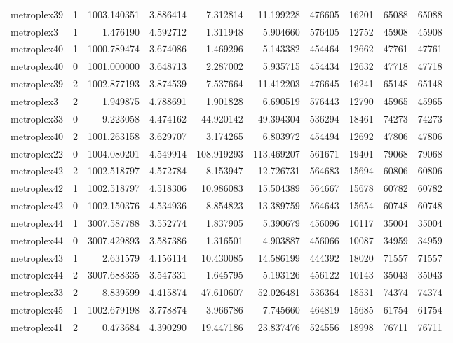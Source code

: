 \begin{longtable}{|l|r|r|r|r|r|r|r|r|r|}
metroplex39 & 1 & 1003.140351 & 3.886414 & 7.312814 & 11.199228 & 476605 & 16201 & 65088 & 65088 \\
metroplex3 & 1 & 1.476190 & 4.592712 & 1.311948 & 5.904660 & 576405 & 12752 & 45908 & 45908 \\
metroplex40 & 1 & 1000.789474 & 3.674086 & 1.469296 & 5.143382 & 454464 & 12662 & 47761 & 47761 \\
metroplex40 & 0 & 1001.000000 & 3.648713 & 2.287002 & 5.935715 & 454434 & 12632 & 47718 & 47718 \\
metroplex39 & 2 & 1002.877193 & 3.874539 & 7.537664 & 11.412203 & 476645 & 16241 & 65148 & 65148 \\
metroplex3 & 2 & 1.949875 & 4.788691 & 1.901828 & 6.690519 & 576443 & 12790 & 45965 & 45965 \\
metroplex33 & 0 & 9.223058 & 4.474162 & 44.920142 & 49.394304 & 536294 & 18461 & 74273 & 74273 \\
metroplex40 & 2 & 1001.263158 & 3.629707 & 3.174265 & 6.803972 & 454494 & 12692 & 47806 & 47806 \\
metroplex22 & 0 & 1004.080201 & 4.549914 & 108.919293 & 113.469207 & 561671 & 19401 & 79068 & 79068 \\
metroplex42 & 2 & 1002.518797 & 4.572784 & 8.153947 & 12.726731 & 564683 & 15694 & 60806 & 60806 \\
metroplex42 & 1 & 1002.518797 & 4.518306 & 10.986083 & 15.504389 & 564667 & 15678 & 60782 & 60782 \\
metroplex42 & 0 & 1002.150376 & 4.534936 & 8.854823 & 13.389759 & 564643 & 15654 & 60748 & 60748 \\
metroplex44 & 1 & 3007.587788 & 3.552774 & 1.837905 & 5.390679 & 456096 & 10117 & 35004 & 35004 \\
metroplex44 & 0 & 3007.429893 & 3.587386 & 1.316501 & 4.903887 & 456066 & 10087 & 34959 & 34959 \\
metroplex43 & 1 & 2.631579 & 4.156114 & 10.430085 & 14.586199 & 444392 & 18020 & 71557 & 71557 \\
metroplex44 & 2 & 3007.688335 & 3.547331 & 1.645795 & 5.193126 & 456122 & 10143 & 35043 & 35043 \\
metroplex33 & 2 & 8.839599 & 4.415874 & 47.610607 & 52.026481 & 536364 & 18531 & 74374 & 74374 \\
metroplex45 & 1 & 1002.679198 & 3.778874 & 3.966786 & 7.745660 & 464819 & 15685 & 61754 & 61754 \\
metroplex41 & 2 & 0.473684 & 4.390290 & 19.447186 & 23.837476 & 524556 & 18998 & 76711 & 76711 \\

\end{longtable}
